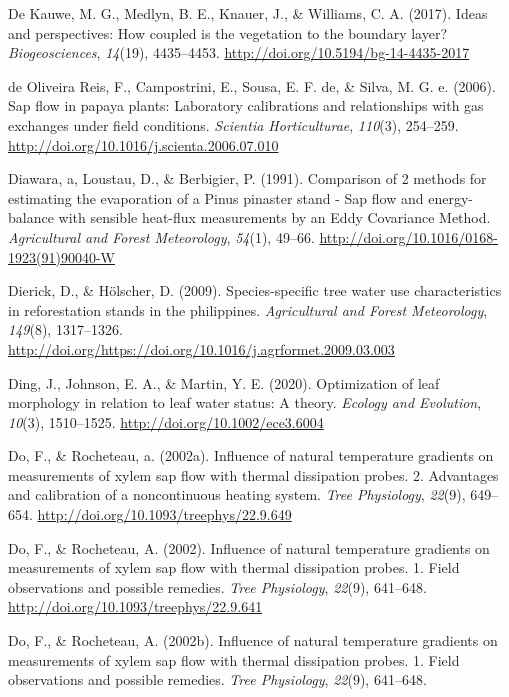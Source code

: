 \documentclass[11pt,twoside]{reedthesis}
\begin{document}
\hypertarget{ref-de_kauwe_ideas_2017}{}
De Kauwe, M. G., Medlyn, B. E., Knauer, J., \& Williams, C. A. (2017).
Ideas and perspectives: How coupled is the vegetation to the boundary
layer? \emph{Biogeosciences}, \emph{14}(19), 4435--4453.
\url{http://doi.org/10.5194/bg-14-4435-2017}

\hypertarget{ref-DeOliveiraReis2006}{}
de Oliveira Reis, F., Campostrini, E., Sousa, E. F. de, \& Silva, M. G.
e. (2006). Sap flow in papaya plants: Laboratory calibrations and
relationships with gas exchanges under field conditions. \emph{Scientia
Horticulturae}, \emph{110}(3), 254--259.
\url{http://doi.org/10.1016/j.scienta.2006.07.010}

\hypertarget{ref-Diawara1991}{}
Diawara, a, Loustau, D., \& Berbigier, P. (1991). Comparison of 2
methods for estimating the evaporation of a Pinus pinaster stand - Sap
flow and energy-balance with sensible heat-flux measurements by an Eddy
Covariance Method. \emph{Agricultural and Forest Meteorology},
\emph{54}(1), 49--66. \url{http://doi.org/10.1016/0168-1923(91)90040-W}

\hypertarget{ref-Dierick2009}{}
Dierick, D., \& Hölscher, D. (2009). Species-specific tree water use
characteristics in reforestation stands in the philippines.
\emph{Agricultural and Forest Meteorology}, \emph{149}(8), 1317--1326.
\url{http://doi.org/https://doi.org/10.1016/j.agrformet.2009.03.003}

\hypertarget{ref-ding_optimization_2020}{}
Ding, J., Johnson, E. A., \& Martin, Y. E. (2020). Optimization of leaf
morphology in relation to leaf water status: A theory. \emph{Ecology and
Evolution}, \emph{10}(3), 1510--1525.
\url{http://doi.org/10.1002/ece3.6004}

\hypertarget{ref-Do2002}{}
Do, F., \& Rocheteau, a. (2002a). Influence of natural temperature
gradients on measurements of xylem sap flow with thermal dissipation
probes. 2. Advantages and calibration of a noncontinuous heating system.
\emph{Tree Physiology}, \emph{22}(9), 649--654.
\url{http://doi.org/10.1093/treephys/22.9.649}

\hypertarget{ref-Do2002b}{}
Do, F., \& Rocheteau, A. (2002). Influence of natural temperature
gradients on measurements of xylem sap flow with thermal dissipation
probes. 1. Field observations and possible remedies. \emph{Tree
Physiology}, \emph{22}(9), 641--648.
\url{http://doi.org/10.1093/treephys/22.9.641}

\hypertarget{ref-Do2002a}{}
Do, F., \& Rocheteau, A. (2002b). Influence of natural temperature
gradients on measurements of xylem sap flow with thermal dissipation
probes. 1. Field observations and possible remedies. \emph{Tree
Physiology}, \emph{22}(9), 641--648.
\end{document}
